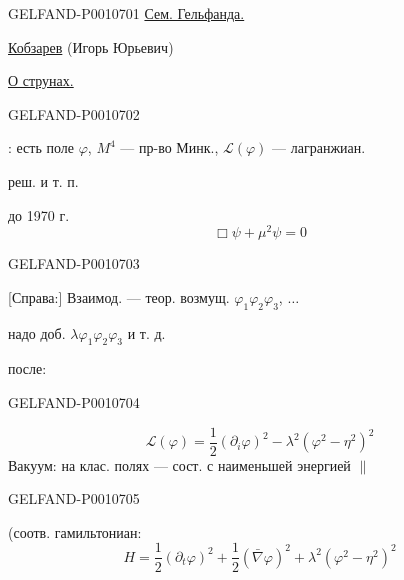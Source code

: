 \begin{GelfandAdjacentEvidence}{GELFAND-P001070}{1}
 \uline{Сем. Гельфанда.}

\uline{Кобзарев} (Игорь Юрьевич)

\uline{О струнах.}
\end{GelfandAdjacentEvidence}
\begin{GelfandAdjacentEvidence}{GELFAND-P001070}{2}


: есть поле $\varphi$, $M^4$ — пр-во Минк., $\mathcal L(\varphi)$ — лагранжиан.

реш. и т. п.


до 1970 г.
\begin{equation*}
\Box\psi+\mu^2\psi=0
\tag{1}
\end{equation*}
\end{GelfandAdjacentEvidence}
\begin{GelfandAdjacentEvidence}{GELFAND-P001070}{3}

[Справа:] Взаимод. — теор. возмущ. $\varphi_1\varphi_2\varphi_3$, $\ldots$

надо доб. $\lambda\varphi_1\varphi_2\varphi_3$ и т. д.

после: 
\end{GelfandAdjacentEvidence}
\begin{GelfandAdjacentEvidence}{GELFAND-P001070}{4}

\begin{equation*}
\mathcal{L}(\varphi)=\frac12(\partial_i\varphi)^2-\lambda^2(\varphi^2-\eta^2)^2
\tag{2}
\end{equation*}
Вакуум: на клас. полях — сост. с наименьшей энергией \(\parallel\)
\end{GelfandAdjacentEvidence}
\begin{GelfandAdjacentEvidence}{GELFAND-P001070}{5}


(соотв. гамильтониан:
\begin{equation*}
H=\frac12(\partial_t\varphi)^2+\frac12(\bar\nabla\varphi)^2+\lambda^2(\varphi^2-\eta^2)^2
\tag{3}
\end{equation*}
\end{GelfandAdjacentEvidence}
